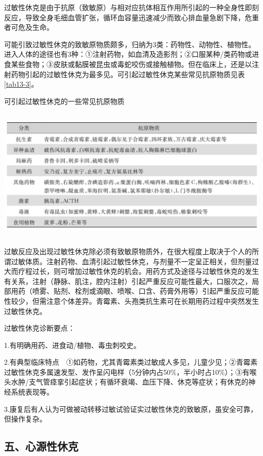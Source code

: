 过敏性休克是由于抗原（致敏原）与相对应抗体相互作用所引起的一种全身性即刻反应，导致全身毛细血管扩张，循环血容量迅速减少而致心排血量急剧下降，危重者可危及生命。

可能引致过敏性休克的致敏原物质颇多，归纳为3类：药物性、动物性、植物性。进入人体的途径也有3种：①注射药物，如血清及造影剂；②口服某种/类药物或进食某些食物；③皮肤或黏膜被昆虫或毒蛇咬伤或接触植物。但在临床上，还是以注射药物引起的过敏性休克为最多见。可引起过敏性休克某些常见抗原物质见表\ref{tab13-3}。

\begin{table}[htbp]
\centering
\caption{可引起过敏性休克的一些常见抗原物质}
\label{tab13-3}
\includegraphics[width=5.9375in,height=2.54167in]{./images/Image00090.jpg}
\end{table}

过敏反应及出现过敏性休克除必须有致敏原物质外，在很大程度上取决于个人的所谓过敏体质。注射药物、血清引起过敏性休克，与剂量不一定呈正相关，但剂量过大而疗程过长，则可增加过敏性休克的机会。用药方式及途径与过敏性休克的发生有关系，注射（静脉、肌注，腔内注射）引起严重反应可能性最大，口服次之，局部用药（喷雾、贴剂、栓剂或滴眼、喷喉、口含、药膏外用等）引起严重反应可能性较少，但需注意个体差异。青霉素、头孢类抗生素可在长期用药过程中突然发生过敏性休克。

过敏性休克诊断要点：

1.有明确用药、进食动/植物、毒虫刺咬史。

2.有典型临床特点　①如药物，尤其青霉素类过敏成人多见，儿童少见；②青霉素过敏性休克多属速发型、发作呈闪电样（5分钟内占50\%，半小时占10\%）；③有喉头水肿/支气管痉挛引起症状；有循环衰竭、血压下降、休克等症状；有休克的神经系统表现等。

3.康复后有人认为可做被动转移过敏试验证实过敏性休克的致敏原，虽安全可靠，但操作复杂。

\subsection{五、心源性休克}

